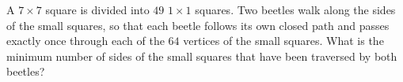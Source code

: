 A $7\times 7$ square is divided into $49$ $1\times 1$ squares.
Two beetles walk along the sides of the small squares, so that each beetle follows its
own closed path and passes exactly once through each of the $64$ vertices of the small squares.
What is the minimum number of sides of the small squares that have been traversed by both beetles?